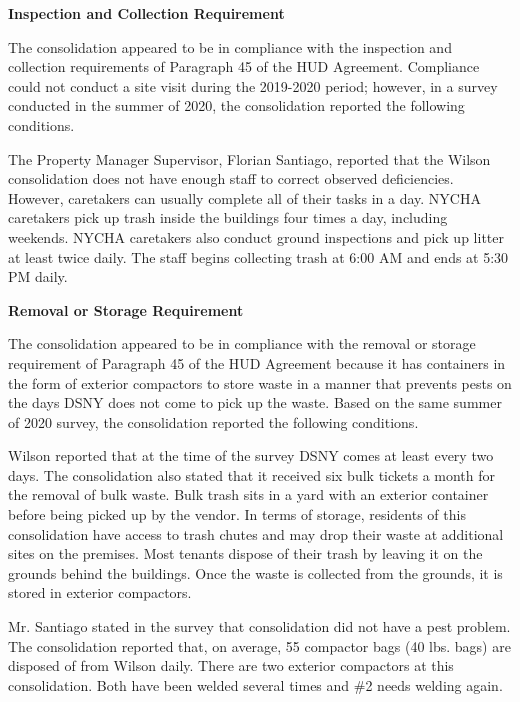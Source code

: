  

\textbf{Inspection and Collection Requirement} 

 

The consolidation appeared to be in compliance with the inspection and collection requirements of Paragraph 45 of the HUD Agreement. Compliance could not conduct a site visit during the 2019-2020 period; however, in a survey conducted in the summer of 2020, the consolidation reported the following conditions.

The Property Manager Supervisor, Florian Santiago, reported that the Wilson consolidation does not have enough staff to correct observed deficiencies. However, caretakers can usually complete all of their tasks in a day. NYCHA caretakers pick up trash inside the buildings four times a day, including weekends. NYCHA caretakers also conduct ground inspections and pick up litter at least twice daily. The staff begins collecting trash at 6:00 AM and ends at 5:30 PM daily.

\textbf{Removal or Storage Requirement} 

The consolidation appeared to be in compliance with the removal or storage requirement of Paragraph  45 of the HUD Agreement because it has containers in the form of exterior compactors to store waste in a manner that prevents pests on the days DSNY does not come to pick up the waste. Based on the same summer of  2020  survey, the consolidation reported the following conditions.

 

Wilson reported that at the time of the survey DSNY comes at least every two days. The consolidation also stated that it received six bulk tickets a month for the removal of bulk waste. Bulk trash sits in a yard with an exterior container before being picked up by the vendor. In terms of storage, residents of this consolidation have access to trash chutes and may drop their waste at additional sites on the premises. Most tenants dispose of their trash by leaving it on the grounds behind the buildings. Once the waste is collected from the grounds, it is stored in exterior compactors.  

 

Mr. Santiago stated in the survey that consolidation did not have a pest problem. The consolidation reported that, on average, 55 compactor bags (40 lbs. bags)  are disposed of from Wilson daily. There are two exterior compactors at this consolidation. Both have been welded several times and \#2 needs welding again.

